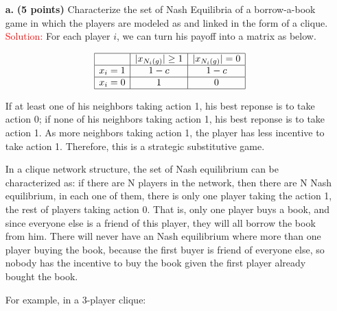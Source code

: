 \documentclass[11pt]{article} %
\begin{document}
\begin{itemize}
\item[\textbf{a.}] \textbf{(5 points)} Characterize the set of Nash Equilibria of a borrow-a-book game in which the players are modeled as and linked in the form of a clique. \\

\textcolor{red}{Solution:}
For each player $i$, we can turn his payoff into a matrix as below.

$$\begin{array} {|c|c|c|c|} \hline
& \text{$|x_{N_i(g)}| \ge 1$} & \text{$|x_{N_i(g)}|=0$}\\ \hline
\text{$x_i=1$} & 1-c & 1-c  \\ \hline
\text{$x_i=0$} & 1 & 0   \\ \hline
\end{array}$$	

If at least one of his neighbors taking action 1, his best reponse is to take action 0; if none of his neighbors taking action 1, his best reponse is to take action 1. As more neighbors taking action 1, the player has less incentive to take action 1. Therefore, this is a strategic substitutive game.

In a clique network structure, the set of Nash equilibrium can be characterized as: if there are N players in the network, then there are N Nash equilibrium, in each one of them, there is only one player taking the action 1, the rest of players taking action 0. That is, only one player buys a book, and since everyone else is a friend of this player, they will all borrow the book from him. There will never have an Nash equilibrium where more than one player buying the book, because the first buyer is friend of everyone else, so nobody has the incentive to buy the book given the first player already bought the book.

For example, in a 3-player clique:
\begin{center}
\end{center}



\end{itemize}
\end{document}
